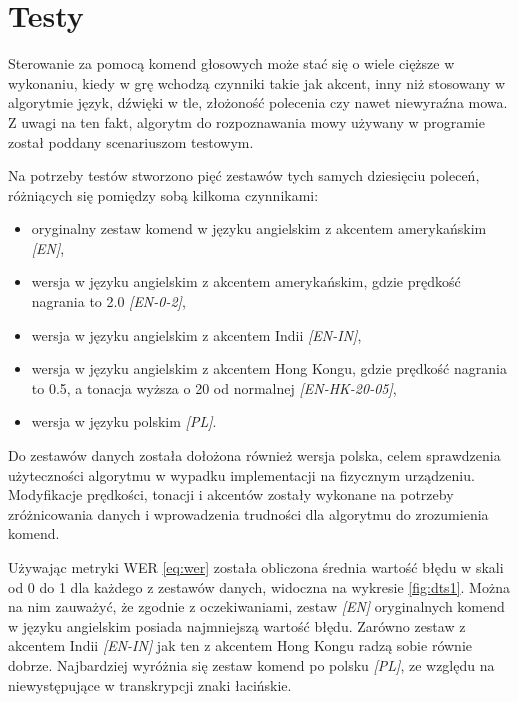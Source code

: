 \chapter{Testy}
\label{cha:testy}

Sterowanie za pomocą komend głosowych może stać się o wiele cięższe w wykonaniu, kiedy w grę wchodzą czynniki takie jak akcent, inny niż stosowany w algorytmie język, dźwięki w tle, złożoność polecenia czy nawet niewyraźna mowa. Z uwagi na ten fakt, algorytm do rozpoznawania mowy używany w programie został poddany scenariuszom testowym. 

Na potrzeby testów stworzono pięć zestawów tych samych dziesięciu poleceń, różniących się pomiędzy sobą kilkoma czynnikami:
\begin{itemize}
    \item oryginalny zestaw komend w języku angielskim z akcentem amerykańskim \textit{[EN]},
    \item wersja w języku angielskim z akcentem amerykańskim, gdzie prędkość nagrania to 2.0 \textit{[EN-0-2]},
    \item wersja w języku angielskim z akcentem Indii \textit{[EN-IN]},
    \item wersja w języku angielskim z akcentem Hong Kongu, gdzie prędkość nagrania to 0.5, a tonacja wyższa o 20 od normalnej \textit{[EN-HK-20-05]},
    \item wersja w języku polskim \textit{[PL]}.
\end{itemize}

Do zestawów danych została dołożona również wersja polska, celem sprawdzenia użyteczności algorytmu w wypadku implementacji na fizycznym urządzeniu. Modyfikacje prędkości, tonacji i akcentów zostały wykonane na potrzeby zróżnicowania danych i wprowadzenia trudności dla algorytmu do zrozumienia komend. 

Używając metryki WER \ref{eq:wer} została obliczona średnia wartość błędu w skali od 0 do 1 dla każdego z zestawów danych, widoczna na wykresie \ref{fig:dts1}. Można na nim zauważyć, że zgodnie z oczekiwaniami, zestaw \textit{[EN]} oryginalnych komend w języku angielskim posiada najmniejszą wartość błędu. Zarówno zestaw z akcentem Indii \textit{[EN-IN]} jak ten z akcentem Hong Kongu radzą sobie równie dobrze. Najbardziej wyróżnia się zestaw komend po polsku \textit{[PL]}, ze względu na niewystępujące w transkrypcji znaki łacińskie.


